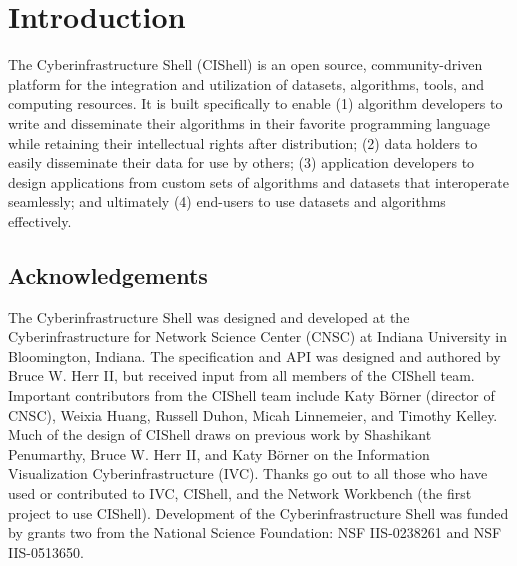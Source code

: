 %

\chapter{Introduction}

The Cyberinfrastructure Shell (CIShell) is an open source, community-driven
platform for the integration and utilization of datasets, algorithms, tools, and
computing resources. It is built specifically to enable (1) algorithm developers
to write and disseminate their algorithms in their favorite programming language
while retaining their intellectual rights after distribution; (2) data holders to
easily disseminate their data for use by others; (3) application developers to
design applications from custom sets of algorithms and datasets that interoperate
seamlessly; and ultimately (4) end-users to use datasets and algorithms
effectively.

\section{Acknowledgements}

The Cyberinfrastructure Shell was designed and developed at the
Cyberinfrastructure for Network Science Center (CNSC) at Indiana University in
Bloomington, Indiana. The specification and API was designed and authored by
Bruce W. Herr II, but received input from all members of the CIShell team.
Important contributors from the CIShell team include Katy B\"{o}rner (director of
CNSC), Weixia Huang, Russell Duhon, Micah Linnemeier, and Timothy Kelley. Much of
the design of CIShell draws on previous work by Shashikant Penumarthy, Bruce W.
Herr II, and Katy B\"{o}rner on the Information Visualization Cyberinfrastructure
(IVC). Thanks go out to all those who have used or contributed to IVC, CIShell,
and the Network Workbench (the first project to use CIShell). Development of the
Cyberinfrastructure Shell was funded by grants two from the National Science
Foundation: NSF IIS-0238261 and NSF IIS-0513650.

